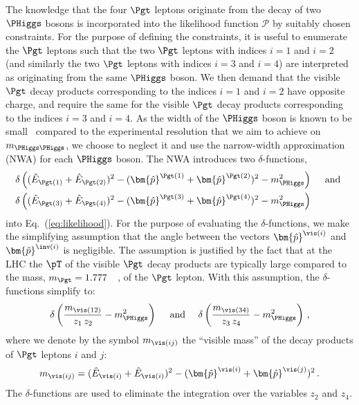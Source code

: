 The knowledge that the four $\Pgt$ leptons originate from the decay of two $\PHiggs$ bosons is incorporated into the likelihood function 
$\mathcal{P}$ by suitably chosen constraints.
For the purpose of defining the constraints, it is useful to enumerate the $\Pgt$ leptons 
such that the two $\Pgt$ leptons with indices $i=1$ and $i=2$ (and similarly the two $\Pgt$ leptons with indices $i=3$ and $i=4$) are interpreted as originating from the same $\PHiggs$ boson.
We then demand that the visible $\Pgt$ decay products corresponding to the indices $i=1$ and $i=2$ have opposite charge,
and require the same for the visible $\Pgt$ decay products corresponding to the indices $i=3$ and $i=4$.
As the width of the $\PHiggs$ boson is known to be small~\cite{HIG-14-002,Aad:2015xua} compared to the experimental resolution that we aim to achieve on $m_{\PHiggs\PHiggs}$,
we choose to neglect it and use the narrow-width approximation (NWA) for each $\PHiggs$ boson.
The NWA introduces two $\delta$-functions, 
\begin{align}
 & \delta\left( (\hat{E}_{\Pgt(1)} + \hat{E}_{\Pgt(2)})^{2} - (\bm{\hat{p}}^{\Pgt(1)} + \bm{\hat{p}}^{\Pgt(2)})^{2} - m_{\PHiggs}^{2} \right) \quad \mbox{ and } \nonumber \\
 & \delta\left( (\hat{E}_{\Pgt(3)} + \hat{E}_{\Pgt(4)})^{2} - (\bm{\hat{p}}^{\Pgt(3)} + \bm{\hat{p}}^{\Pgt(4)})^{2} - m_{\PHiggs}^{2} \right)
\end{align}
into Eq.~(\ref{eq:likelihood}).
For the purpose of evaluating the $\delta$-functions,
we make the simplifying assumption that the angle between the vectors $\bm{\hat{p}}^{\vis(i)}$ and $\bm{\hat{p}}^{\inv(i)}$ is negligible.
The assumption is justified by the fact that at the LHC the $\pT$ of the visible $\Pgt$ decay products are typically large compared to the mass, 
$m_{\Pgt} = 1.777$~\GeV~\cite{PDG}, of the $\Pgt$ lepton.
With this assumption, the $\delta$-functions simplify to:
\begin{equation*}
\delta\left(\frac{m_{\vis(12)}}{z_{1} \, z_{2}} - m_{\PHiggs}^{2}\right) \quad \mbox{ and } \quad \delta\left(\frac{m_{\vis(34)}}{z_{3} \, z_{4}} - m_{\PHiggs}^{2}\right) \, ,
\end{equation*}
where we denote by the symbol $m_{\vis(ij)}$ the ``visible mass'' of the decay products of $\Pgt$ leptons $i$ and $j$:
\begin{equation*}
m_{\vis(ij)} = (\hat{E}_{\vis(i)} + \hat{E}_{\vis(i)})^{2} - (\bm{\hat{p}}^{\vis(i)} + \bm{\hat{p}}^{\vis(j)})^{2} \, .
\end{equation*}
The $\delta$-functions are used to eliminate the integration over the variables $z_{2}$ and $z_{4}$.
